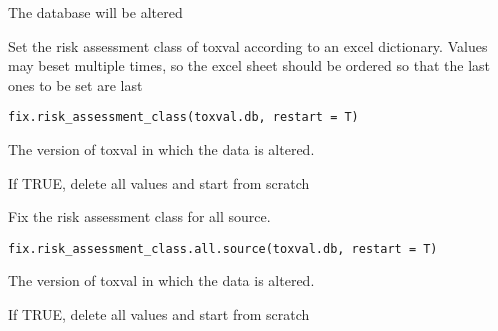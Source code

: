 \documentclass[letterpaper]{book}
\begin{document}
%
\begin{Value}
The database will be altered
\end{Value}
%
\begin{Description}\relax
Set the risk assessment class of toxval according to an excel dictionary.
Values may beset multiple times, so the excel sheet should be ordered so that
the last ones to be set are last
\end{Description}
%
\begin{Usage}
\begin{verbatim}
fix.risk_assessment_class(toxval.db, restart = T)
\end{verbatim}
\end{Usage}
%
\begin{Arguments}
\begin{ldescription}
\item[\code{toxval.db}] The version of toxval in which the data is altered.

\item[\code{restart}] If TRUE, delete all values and start from scratch
\end{ldescription}
\end{Arguments}
%
\begin{Description}\relax
Fix the risk assessment class for all source.
\end{Description}
%
\begin{Usage}
\begin{verbatim}
fix.risk_assessment_class.all.source(toxval.db, restart = T)
\end{verbatim}
\end{Usage}
%
\begin{Arguments}
\begin{ldescription}
\item[\code{toxval.db}] The version of toxval in which the data is altered.

\item[\code{restart}] If TRUE, delete all values and start from scratch
\end{ldescription}
\end{Arguments}
\end{document}
